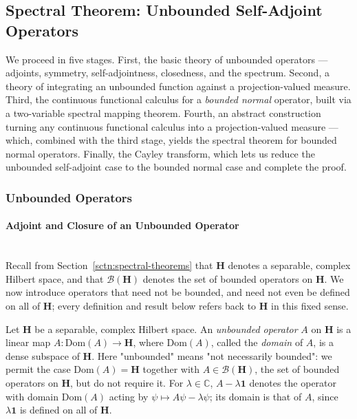 \subsection{Spectral Theorem: Unbounded Self-Adjoint Operators}
We proceed in five stages. First, the basic theory of unbounded operators — adjoints, symmetry, self-adjointness, closedness, and the spectrum. Second, a theory of integrating an unbounded function against a projection-valued measure. Third, the continuous functional calculus for a \textit{bounded normal} operator, built via a two-variable spectral mapping theorem. Fourth, an abstract construction turning any continuous functional calculus into a projection-valued measure — which, combined with the third stage, yields the spectral theorem for bounded normal operators. Finally, the Cayley transform, which lets us reduce the unbounded self-adjoint case to the bounded normal case and complete the proof.

\subsubsection{Unbounded Operators}

\paragraph{Adjoint and Closure of an Unbounded Operator}\mbox{}\\
Recall from Section~\ref{sctn:spectral-theorems} that $\mathbf{H}$ denotes a separable, complex Hilbert space, and that $\mathcal{B}(\mathbf{H})$ denotes the set of bounded operators on $\mathbf{H}$. We now introduce operators that need not be bounded, and need not even be defined on all of $\mathbf{H}$; every definition and result below refers back to $\mathbf{H}$ in this fixed sense.

\begin{definition}
    \label{def:hall-3.1}
    \leanok
    Let $\mathbf{H}$ be a separable, complex Hilbert space. An \textit{unbounded operator} $A$ on $\mathbf{H}$ is a linear map $A : \text{Dom}(A) \to \mathbf{H}$, where $\text{Dom}(A)$, called the \textit{domain} of $A$, is a dense subspace of $\mathbf{H}$. Here "unbounded" means "not necessarily bounded": we permit the case $\text{Dom}(A) = \mathbf{H}$ together with $A \in \mathcal{B}(\mathbf{H})$, the set of bounded operators on $\mathbf{H}$, but do not require it.
    For $\lambda \in \mathbb{C}$, $A - \lambda\mathbf{1}$ denotes the operator with domain $\text{Dom}(A)$ acting by $\psi \mapsto A\psi - \lambda\psi$; its domain is that of $A$, since $\lambda\mathbf{1}$ is defined on all of $\mathbf{H}$.
\end{definition}

